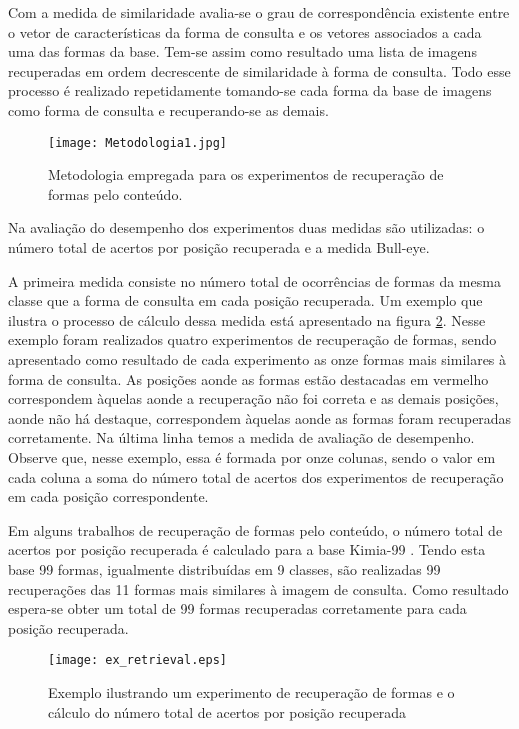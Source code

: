Com a medida de similaridade avalia-se o grau de correspondência existente entre o vetor de características da forma de consulta e os vetores associados a cada uma das formas da base. Tem-se assim como resultado uma lista de imagens recuperadas em ordem decrescente de similaridade à forma de consulta. Todo esse processo é realizado repetidamente tomando-se cada forma da base de imagens como forma de consulta e recuperando-se as demais.

\begin{figure}[h!]
  \caption{\label{fig:metodo_cbir} Metodologia empregada para os experimentos de recuperação de formas pelo conteúdo.}
  \centering
  \texttt{[image: Metodologia1.jpg]}
\end{figure}

Na avaliação do desempenho dos experimentos duas medidas são utilizadas: o número total de acertos por posição recuperada e a medida Bull-eye.

A primeira medida consiste no número total de ocorrências de formas da mesma classe que a forma de consulta em cada posição recuperada. Um exemplo que ilustra o processo de cálculo dessa medida está apresentado na figura \ref{fig:ex_metodo_cbir}. Nesse exemplo foram realizados quatro experimentos de recuperação de formas, sendo apresentado como resultado de cada experimento as onze formas mais similares à forma de consulta. As posições aonde as formas estão destacadas em vermelho correspondem àquelas aonde a recuperação não foi correta e as demais posições, aonde não há destaque, correspondem àquelas aonde as formas foram recuperadas corretamente. Na última linha temos a medida de avaliação de desempenho. Observe que, nesse exemplo, essa é formada por onze colunas, sendo o valor em cada coluna a soma do número total de acertos dos experimentos de recuperação em cada posição correspondente.

Em alguns trabalhos de recuperação de formas pelo conteúdo, o número total de acertos por posição recuperada é calculado para a base Kimia-99 \cite{Bernier:2003}. Tendo esta base 99 formas, igualmente distribuídas em 9 classes, são realizadas 99 recuperações das 11 formas mais similares à imagem de consulta. Como resultado espera-se obter um total de 99 formas recuperadas corretamente para cada posição recuperada.

\begin{figure}[h!]
  \caption{\label{fig:ex_metodo_cbir} Exemplo ilustrando um experimento de recuperação de formas e o cálculo do número total de acertos por posição recuperada}
  \centering
  \texttt{[image: ex\_retrieval.eps]}
\end{figure}

